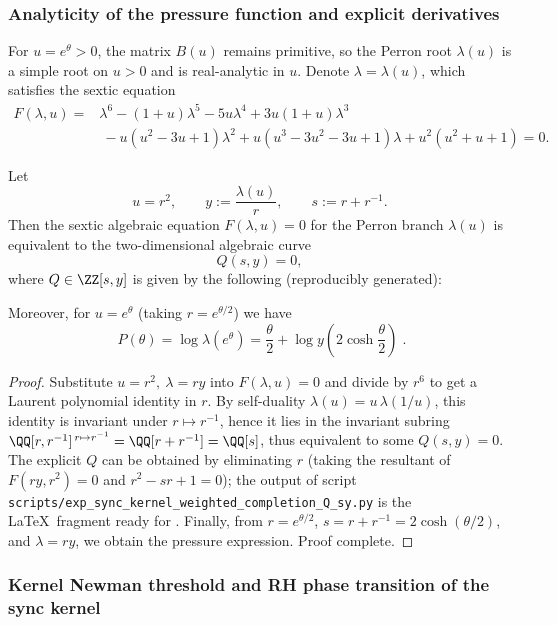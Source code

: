 \subsubsection{Analyticity of the pressure function and explicit derivatives}\label{app:pressure-analytic}
For $u=e^\theta>0$, the matrix $B(u)$ remains primitive, so the Perron root $\lambda(u)$ is a simple root on $u>0$ and is real-analytic in $u$. Denote $\lambda=\lambda(u)$, which satisfies the sextic equation
\[
\begin{aligned}
F(\lambda,u)
={}&\lambda^6-(1+u)\lambda^5-5u\lambda^4+3u(1+u)\lambda^3\\
&\ -u(u^2-3u+1)\lambda^2+u(u^3-3u^2-3u+1)\lambda+u^2(u^2+u+1)=0.
\end{aligned}
\]
\begin{proposition}[Completion palindrome dimension reduction: \texorpdfstring{$F(\lambda,u)=0$}{F=0} equivalent to \texorpdfstring{$Q(s,y)=0$}{Q=0}]\label{prop:weighted-completion-Q}
Let
$$
u=r^2,\qquad y:=\frac{\lambda(u)}{r},\qquad s:=r+r^{-1}.
$$
Then the sextic algebraic equation \(F(\lambda,u)=0\) for the Perron branch \(\lambda(u)\) is equivalent to the two-dimensional algebraic curve
\[
Q(s,y)=0,
\]
where \(Q\in\ZZ[s,y]\) is given by the following (reproducibly generated):

Moreover, for \(u=e^\theta\) (taking \(r=e^{\theta/2}\)) we have
\[
\boxed{\;
P(\theta)=\log\lambda(e^\theta)=\frac{\theta}{2}+\log y\!\left(2\cosh\frac{\theta}{2}\right)\; }.
\]
\end{proposition}
\begin{proof}
Substitute \(u=r^2,\ \lambda=r y\) into \(F(\lambda,u)=0\) and divide by \(r^6\) to get a Laurent polynomial identity in \(r\).
By self-duality \(\lambda(u)=u\,\lambda(1/u)\), this identity is invariant under \(r\mapsto r^{-1}\), hence it lies in the invariant subring
\(
\QQ[r,r^{-1}]^{\,r\mapsto r^{-1}}=\QQ[r+r^{-1}]=\QQ[s]
\),
thus equivalent to some \(Q(s,y)=0\).
The explicit \(Q\) can be obtained by eliminating \(r\) (taking the resultant of \(F(r y,r^2)=0\) and \(r^2-sr+1=0\)); the output of script \texttt{scripts/exp\_sync\_kernel\_weighted\_completion\_Q\_sy.py} is the \LaTeX\ fragment ready for \verb||.
Finally, from \(r=e^{\theta/2}\), \(s=r+r^{-1}=2\cosh(\theta/2)\), and \(\lambda=r y\), we obtain the pressure expression. Proof complete.
\end{proof}

\subsubsection{Kernel Newman threshold and RH phase transition of the sync kernel}\label{app:sync-kernel-weighted-newman-threshold}


